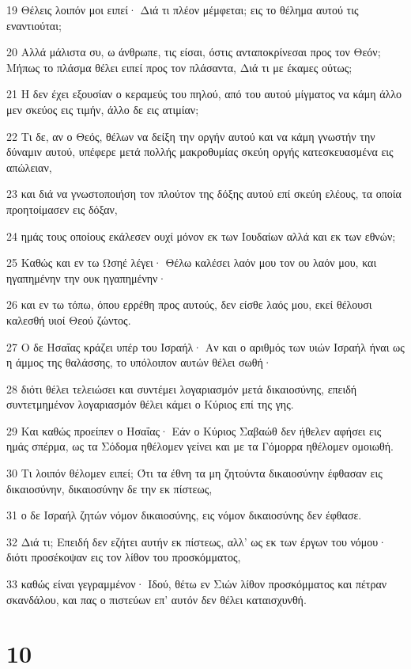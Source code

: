 \par 19 Θέλεις λοιπόν μοι ειπεί· Διά τι πλέον μέμφεται; εις το θέλημα αυτού τις εναντιούται;
\par 20 Αλλά μάλιστα συ, ω άνθρωπε, τις είσαι, όστις ανταποκρίνεσαι προς τον Θεόν; Μήπως το πλάσμα θέλει ειπεί προς τον πλάσαντα, Διά τι με έκαμες ούτως;
\par 21 Η δεν έχει εξουσίαν ο κεραμεύς του πηλού, από του αυτού μίγματος να κάμη άλλο μεν σκεύος εις τιμήν, άλλο δε εις ατιμίαν;
\par 22 Τι δε, αν ο Θεός, θέλων να δείξη την οργήν αυτού και να κάμη γνωστήν την δύναμιν αυτού, υπέφερε μετά πολλής μακροθυμίας σκεύη οργής κατεσκευασμένα εις απώλειαν,
\par 23 και διά να γνωστοποιήση τον πλούτον της δόξης αυτού επί σκεύη ελέους, τα οποία προητοίμασεν εις δόξαν,
\par 24 ημάς τους οποίους εκάλεσεν ουχί μόνον εκ των Ιουδαίων αλλά και εκ των εθνών;
\par 25 Καθώς και εν τω Ωσηέ λέγει· Θέλω καλέσει λαόν μου τον ου λαόν μου, και ηγαπημένην την ουκ ηγαπημένην·
\par 26 και εν τω τόπω, όπου ερρέθη προς αυτούς, δεν είσθε λαός μου, εκεί θέλουσι καλεσθή υιοί Θεού ζώντος.
\par 27 Ο δε Ησαΐας κράζει υπέρ του Ισραήλ· Αν και ο αριθμός των υιών Ισραήλ ήναι ως η άμμος της θαλάσσης, το υπόλοιπον αυτών θέλει σωθή·
\par 28 διότι θέλει τελειώσει και συντέμει λογαριασμόν μετά δικαιοσύνης, επειδή συντετμημένον λογαριασμόν θέλει κάμει ο Κύριος επί της γης.
\par 29 Και καθώς προείπεν ο Ησαΐας· Εάν ο Κύριος Σαβαώθ δεν ήθελεν αφήσει εις ημάς σπέρμα, ως τα Σόδομα ηθέλομεν γείνει και με τα Γόμορρα ηθέλομεν ομοιωθή.
\par 30 Τι λοιπόν θέλομεν ειπεί; Ότι τα έθνη τα μη ζητούντα δικαιοσύνην έφθασαν εις δικαιοσύνην, δικαιοσύνην δε την εκ πίστεως,
\par 31 ο δε Ισραήλ ζητών νόμον δικαιοσύνης, εις νόμον δικαιοσύνης δεν έφθασε.
\par 32 Διά τι; Επειδή δεν εζήτει αυτήν εκ πίστεως, αλλ' ως εκ των έργων του νόμου· διότι προσέκοψαν εις τον λίθον του προσκόμματος,
\par 33 καθώς είναι γεγραμμένον· Ιδού, θέτω εν Σιών λίθον προσκόμματος και πέτραν σκανδάλου, και πας ο πιστεύων επ' αυτόν δεν θέλει καταισχυνθή.

\chapter{10}

